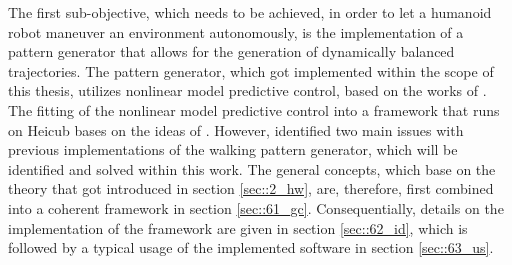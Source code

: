 \label{sec::6_pg}
The first sub-objective, which needs to be achieved, in order to let a humanoid robot maneuver an environment autonomously, is the implementation of a pattern generator that allows for the generation of dynamically balanced trajectories. The pattern generator, which got implemented within the scope of this thesis, utilizes nonlinear model predictive control, based on the works of \cite{naveau2016reactive}. The fitting of the nonlinear model predictive control into a framework that runs on Heicub bases on the ideas of \cite{stein2017closed}. However, \cite{stein2017closed} identified two main issues with previous implementations of the walking pattern generator, which will be identified and solved within this work. The general concepts, which base on the theory that got introduced in section \ref{sec::2_hw}, are, therefore, first combined into a coherent framework in section \ref{sec::61_gc}. Consequentially, details on the implementation of the framework are given in section \ref{sec::62_id}, which is followed by a typical usage of the implemented software in section \ref{sec::63_us}.